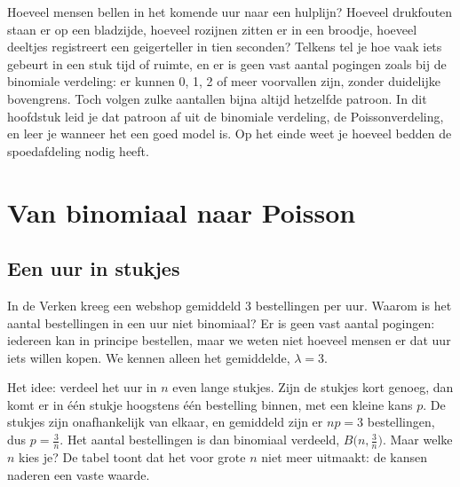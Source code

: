 Hoeveel mensen bellen in het komende uur naar een hulplijn? Hoeveel drukfouten staan er op een bladzijde, hoeveel rozijnen zitten er in een broodje, hoeveel deeltjes registreert een geigerteller in tien seconden? Telkens tel je hoe vaak iets gebeurt in een stuk tijd of ruimte, en er is geen vast aantal pogingen zoals bij de binomiale verdeling: er kunnen 0, 1, 2 of meer voorvallen zijn, zonder duidelijke bovengrens. Toch volgen zulke aantallen bijna altijd hetzelfde patroon. In dit hoofdstuk leid je dat patroon af uit de binomiale verdeling, de Poissonverdeling, en leer je wanneer het een goed model is. Op het einde weet je hoeveel bedden de spoedafdeling nodig heeft.

\begin{oefeningen}[Start]

\end{oefeningen}


\section{Van binomiaal naar Poisson}

\subsection{Een uur in stukjes}

In de Verken kreeg een webshop gemiddeld 3 bestellingen per uur. Waarom is het aantal bestellingen in een uur niet binomiaal? Er is geen vast aantal pogingen: iedereen kan in principe bestellen, maar we weten niet hoeveel mensen er dat uur iets willen kopen. We kennen alleen het gemiddelde, $\lambda = 3$.

Het idee: verdeel het uur in $n$ even lange stukjes. Zijn de stukjes kort genoeg, dan komt er in één stukje hoogstens één bestelling binnen, met een kleine kans $p$. De stukjes zijn onafhankelijk van elkaar, en gemiddeld zijn er $np = 3$ bestellingen, dus $p = \frac{3}{n}$. Het aantal bestellingen is dan binomiaal verdeeld, $B\bigl(n, \frac{3}{n}\bigr)$. Maar welke $n$ kies je? De tabel toont dat het voor grote $n$ niet meer uitmaakt: de kansen naderen een vaste waarde.

